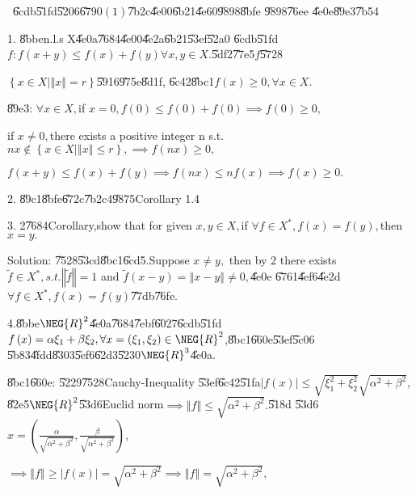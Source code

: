 \documentclass{article}
\begin{document}
\bigskip\ 
\U{6cdb}\U{51fd}\U{5206}\U{6790}$\left(
1\right) $\U{7b2c}\U{4e00}\U{6b21}\U{4e60}\U{9898}\U{8bfe} \U{9898}\U{76ee}%
\U{4e0e}\U{89e3}\U{7b54}

1. \U{8bbe}n.l.s X\U{4e0a}\U{7684}\U{4e00}\U{4e2a}\U{6b21}\U{53ef}\U{52a0}%
\U{6cdb}\U{51fd}$f:f(x+y)\leq f\left( x\right) +f\left( y\right) \forall
x,y\in X.$\U{5df2}\U{77e5}$f$\U{5728}

$\left\{ x\in X|\left\Vert x\right\Vert =r\right\} $\U{5916}\U{975e}\U{8d1f},%
\U{6c42}\U{8bc1}$f\left( x\right) \geq 0,\forall x\in X.$

\U{89e3}: $\forall x\in X,$if $x=0,f\left( 0\right) \leq f\left( 0\right)
+f\left( 0\right) \implies f\left( 0\right) \geq 0,$

if $x\neq 0,$there exists a positive integer n s.t. $nx\notin \left\{ x\in
X|\left\Vert x\right\Vert \leq r\right\} ,\implies f\left( nx\right) \geq 0,$

$f(x+y)\leq f\left( x\right) +f\left( y\right) \implies f\left( nx\right)
\leq nf\left( x\right) \implies f\left( x\right) \geq 0.$

2. \U{89c1}\U{8bfe}\U{672c}\U{7b2c}4\U{9875}Corollary 1.4

3. 2\U{7684}Corollary,show that for given $x,y\in X,$if $\forall f\in
X^{\ast },f\left( x\right) =f\left( y\right) ,$then $x=y.$

Solution: \U{7528}\U{53cd}\U{8bc1}\U{6cd5}.Suppose $x\neq y,$ then by 2
there exists $\tilde{f}\in X^{\ast },s.t.\left\Vert \tilde{f}\right\Vert =1$
and $\tilde{f}\left( x-y\right) =\left\Vert x-y\right\Vert \neq 0,$\U{4e0e}%
\U{6761}\U{4ef6}\U{4e2d} $\forall f\in X^{\ast },f\left( x\right) =f\left(
y\right) $\U{77db}\U{76fe}.

4.\U{8bbe}$\NEG{R}^{2}$\U{4e0a}\U{7684}\U{7ebf}\U{6027}\U{6cdb}\U{51fd}$%
f\left( x\right) =\alpha \xi _{1}+\beta \xi _{2},\forall x=\left( \xi
_{1},\xi _{2}\right) \in \NEG{R}^{2}$,\U{8bc1}\U{660e}\U{53ef}\U{5c06}%
\U{5b83}\U{4fdd}\U{8303}\U{5ef6}\U{62d3}\U{5230}$\NEG{R}^{3}$\U{4e0a}.

\U{8bc1}\U{660e}: \U{5229}\U{7528}Cauchy-Inequality \U{53ef}\U{6c42}\U{51fa}$%
\left\vert f\left( x\right) \right\vert \leq \sqrt{\xi _{1}^{2}+\xi _{2}^{2}}%
\sqrt{\alpha ^{2}+\beta ^{2}},$\U{82e5}$\NEG{R}^{2}$\U{53d6}Euclid norm$%
\implies \left\Vert f\right\Vert \leq \sqrt{\alpha ^{2}+\beta ^{2}}.$\U{518d}%
\U{53d6}$x=\left( \frac{\alpha }{\sqrt{\alpha ^{2}+\beta ^{2}}},\frac{\beta 
}{\sqrt{\alpha ^{2}+\beta ^{2}}}\right) ,$

$\implies \left\Vert f\right\Vert \geq \left\vert f\left( x\right)
\right\vert =\sqrt{\alpha ^{2}+\beta ^{2}}\implies \left\Vert f\right\Vert =%
\sqrt{\alpha ^{2}+\beta ^{2}},$
\end{document}
